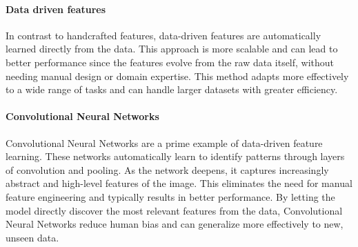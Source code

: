 \paragraph*{Data driven features}
In contrast to handcrafted features, data-driven features are automatically learned directly from the data. 
This approach is more scalable and can lead to better performance since the features evolve from the raw data itself, without needing manual design or domain expertise.
This method adapts more effectively to a wide range of tasks and can handle larger datasets with greater efficiency.

\paragraph*{Convolutional Neural Networks}
Convolutional Neural Networks are a prime example of data-driven feature learning. 
These networks automatically learn to identify patterns through layers of convolution and pooling. 
As the network deepens, it captures increasingly abstract and high-level features of the image. 
This eliminates the need for manual feature engineering and typically results in better performance. 
By letting the model directly discover the most relevant features from the data, Convolutional Neural Networks reduce human bias and can generalize more effectively to new, unseen data.